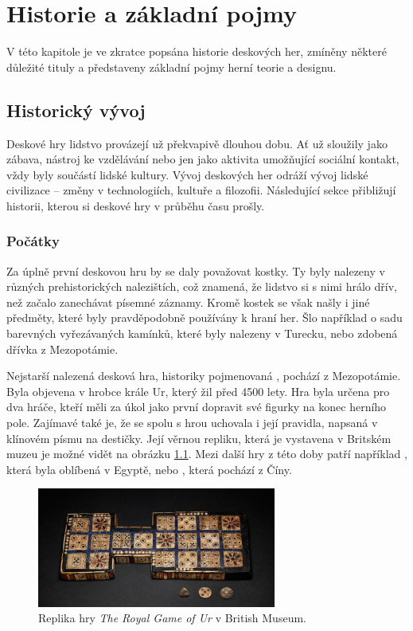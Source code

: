 \chapter{Historie a základní pojmy}
\label{chap:theory}

V této kapitole je ve zkratce popsána historie deskových her, zmíněny některé důležité tituly a představeny základní pojmy herní teorie a designu.


\section{Historický vývoj}
\label{sec:history}

Deskové hry lidstvo provázejí už překvapivě dlouhou dobu. Ať už sloužily jako zábava, nástroj ke vzdělávání nebo jen jako aktivita umožňující sociální kontakt, vždy byly součástí lidské kultury. Vývoj deskových her odráží vývoj lidské civilizace -- změny v technologiích, kultuře a filozofii. Následující sekce přibližují historii, kterou si deskové hry v průběhu času prošly.

\subsection{Počátky}
\label{subsec:beginnings}

Za úplně první deskovou hru by se daly považovat kostky. Ty byly nalezeny v různých prehistorických nalezištích, což znamená, že lidstvo si s nimi hrálo dřív, než začalo zanechávat písemné záznamy. Kromě kostek se však našly i jiné předměty, které byly pravděpodobně používány k hraní her. Šlo například o sadu barevných vyřezávaných kamínků, které byly nalezeny v Turecku, nebo zdobená dřívka z Mezopotámie. \cite{attia_2018}

Nejstarší nalezená desková hra, historiky pojmenovaná , pochází z Mezopotámie. Byla objevena v hrobce krále Ur, který žil před 4500 lety. Hra byla určena pro dva hráče, kteří měli za úkol jako první dopravit své figurky na konec herního pole. Zajímavé také je, že se spolu s hrou uchovala i její pravidla, napsaná v klínovém písmu na destičky. Její věrnou repliku, která je vystavena v Britském muzeu je možné vidět na obrázku \ref{fig:royal_game_of_ur}. Mezi další hry z této doby patří například , která byla oblíbená v Egyptě, nebo , která pochází z Číny. \cite{british_museum_2021}

\begin{figure}[h]
    \centering
    \includegraphics[width=0.7\textwidth]{figures/images/royal-game-of-ur-british-museum.jpg}
    \caption{Replika hry \textit{The Royal Game of Ur} v British Museum. \cite{british_museum_2021}}
    \label{fig:royal_game_of_ur}
\end{figure}

